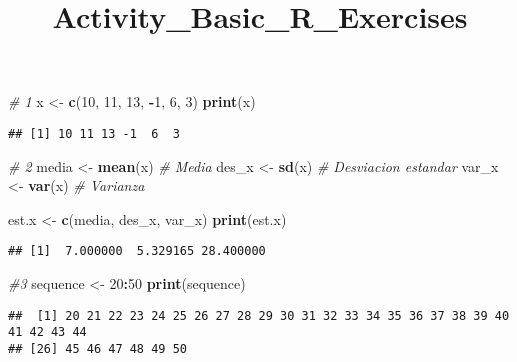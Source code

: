 \documentclass[
]{article}
\title{Activity\_Basic\_R\_Exercises}
\author{}
\date{\vspace{-2.5em}}
\newenvironment{Shaded}{\begin{snugshade}}{\end{snugshade}}
\newcommand{\CommentTok}[1]{\textcolor[rgb]{0.56,0.35,0.01}{\textit{#1}}}
\newcommand{\DecValTok}[1]{\textcolor[rgb]{0.00,0.00,0.81}{#1}}
\newcommand{\FunctionTok}[1]{\textcolor[rgb]{0.13,0.29,0.53}{\textbf{#1}}}
\newcommand{\NormalTok}[1]{#1}
\newcommand{\OtherTok}[1]{\textcolor[rgb]{0.56,0.35,0.01}{#1}}
\newcommand{\SpecialCharTok}[1]{\textcolor[rgb]{0.81,0.36,0.00}{\textbf{#1}}}
\begin{document}
\maketitle

\begin{Shaded}
\begin{Highlighting}[]
\CommentTok{\# 1}
\NormalTok{x }\OtherTok{\textless{}{-}} \FunctionTok{c}\NormalTok{(}\DecValTok{10}\NormalTok{, }\DecValTok{11}\NormalTok{, }\DecValTok{13}\NormalTok{, }\SpecialCharTok{{-}}\DecValTok{1}\NormalTok{, }\DecValTok{6}\NormalTok{, }\DecValTok{3}\NormalTok{)}
\FunctionTok{print}\NormalTok{(x)}
\end{Highlighting}
\end{Shaded}

\begin{verbatim}
## [1] 10 11 13 -1  6  3
\end{verbatim}

\begin{Shaded}
\begin{Highlighting}[]
\CommentTok{\# 2}
\NormalTok{media }\OtherTok{\textless{}{-}} \FunctionTok{mean}\NormalTok{(x) }\CommentTok{\# Media}
\NormalTok{des\_x }\OtherTok{\textless{}{-}} \FunctionTok{sd}\NormalTok{(x) }\CommentTok{\# Desviacion estandar}
\NormalTok{var\_x }\OtherTok{\textless{}{-}} \FunctionTok{var}\NormalTok{(x) }\CommentTok{\# Varianza}

\NormalTok{est.x }\OtherTok{\textless{}{-}} \FunctionTok{c}\NormalTok{(media, des\_x, var\_x)}
\FunctionTok{print}\NormalTok{(est.x)}
\end{Highlighting}
\end{Shaded}

\begin{verbatim}
## [1]  7.000000  5.329165 28.400000
\end{verbatim}

\begin{Shaded}
\begin{Highlighting}[]
\CommentTok{\#3}
\NormalTok{sequence }\OtherTok{\textless{}{-}} \DecValTok{20}\SpecialCharTok{:}\DecValTok{50}
\FunctionTok{print}\NormalTok{(sequence)}
\end{Highlighting}
\end{Shaded}

\begin{verbatim}
##  [1] 20 21 22 23 24 25 26 27 28 29 30 31 32 33 34 35 36 37 38 39 40 41 42 43 44
## [26] 45 46 47 48 49 50
\end{verbatim}
\end{document}
